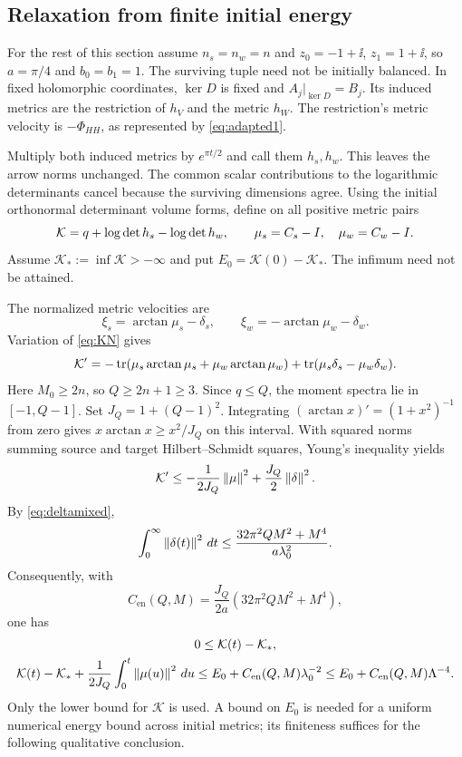 \subsection{Relaxation from finite initial energy}
For the rest of this section assume $n_s=n_w=n$ and
$z_0=-1+\ii$, $z_1=1+\ii$, so $a=\pi/4$ and $b_0=b_1=1$.
The surviving tuple need not be initially balanced.
In fixed holomorphic coordinates, $\ker D$ is fixed and
$A_j|_{\ker D}=B_j$. Its induced metrics are the restriction of
$h_V$ and the metric $h_W$. The restriction's metric velocity is
$-\Phi_{HH}$, as represented by \eqref{eq:adapted1}.

Multiply both induced metrics by $e^{\pi t/2}$ and call them
$h_s,h_w$. This leaves the arrow norms unchanged. The common scalar
contributions to the logarithmic determinants cancel because the
surviving dimensions agree. Using the initial orthonormal determinant
volume forms, define on all positive metric pairs
\begin{equation}\label{eq:KN}
 \mathcal K=q+\log\det h_s-\log\det h_w,\qquad
 \mu_s=C_s-I,\quad\mu_w=C_w-I.
\end{equation}
Assume $\mathcal K_*:=\inf\mathcal K> -\infty$ and put
$E_0=\mathcal K(0)-\mathcal K_*$. The infimum need not be attained.

The normalized metric velocities are
\[
 \xi_s=\arctan\mu_s-\delta_s,\qquad
 \xi_w=-\arctan\mu_w-\delta_w.
\]
Variation of \eqref{eq:KN} gives
\[
 \mathcal K'
 =-\operatorname{tr}(\mu_s\arctan\mu_s+\mu_w\arctan\mu_w)
      +\operatorname{tr}(\mu_s\delta_s-\mu_w\delta_w).
\]
Here $M_0\geq2n$, so $Q\geq2n+1\geq3$. Since $q\leq Q$,
the moment spectra lie in $[-1,Q-1]$. Set $J_Q=1+(Q-1)^2$.
Integrating $(\arctan x)'=(1+x^2)^{-1}$ from zero gives
$x\arctan x\geq x^2/J_Q$ on this interval.
With squared norms summing source and target Hilbert--Schmidt squares,
Young's inequality yields
\begin{equation}\label{eq:KNderivative}
 \mathcal K'\leq-\frac1{2J_Q}\left\lVert\mu\right\rVert^2+\frac{J_Q}{2}\left\lVert\delta\right\rVert^2.
\end{equation}
By \eqref{eq:deltamixed},
\[
 \int_0^\infty\left\lVert\delta(t)\right\rVert^2\,dt
 \leq\frac{32\pi^2QM^2+M^4}{a\lambda_0^2}.
\]
Consequently, with
\begin{equation}\label{eq:mixedenergyconstant}
 C_{\mathrm{en}}(Q,M)=\frac{J_Q}{2a}(32\pi^2QM^2+M^4),
\end{equation}
one has
\begin{equation}\label{eq:KNbound}
 \begin{gathered}
 0\leq\mathcal K(t)-\mathcal K_*,\\
 \mathcal K(t)-\mathcal K_*+
 \frac1{2J_Q}\int_0^t\left\lVert\mu(u)\right\rVert^2\,du
 \leq E_0+C_{\mathrm{en}}(Q,M)\lambda_0^{-2}
 \leq E_0+C_{\mathrm{en}}(Q,M)\Lambda^{-4}.
 \end{gathered}
\end{equation}
Only the lower bound for $\mathcal K$ is used. A bound on $E_0$ is
needed for a uniform numerical energy bound across initial metrics;
its finiteness suffices for the following qualitative conclusion.

